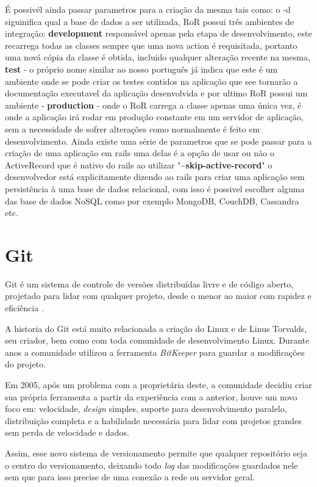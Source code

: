 É possivél ainda passar parametros para a criação da mesma tais como:
o -d siguinifica qual a base de dados a ser utilizada, RoR possui três ambientes de integração: \textbf{development} responsável apenas pela etapa de desenvolvimento, 
este recarrega todas as classes sempre que uma nova action é requisitada, portanto uma nová cópia da classe é obtida, incluido qualquer alteração recente na mesma,
\textbf{test} - o próprio nome similar ao nosso português já indica que este é um ambiente onde se pode criar os testes contidos na aplicação que see tornarão a documentação
executavel da aplicação desenvolvida e por ultimo RoR possui um ambiente - \textbf{production} - onde o RoR carrega a classe apenas uma única vez, é onde a aplicação irá rodar em produção constante em um servidor de aplicação,
sem a necessidade de sofrer alterações como normalmente é feito em desenvolvimento. Ainda existe uma série de parametros que se pode passar para a criação de uma aplicação em rails uma delas é a opção de usar ou não o ActiveRecord
que é nativo do rails ao utilizar "\textbf{--skip-active-record}" o desenvolvedor está explicitamente dizendo ao rails para criar uma aplicação sem persistência à uma base de dados relacional, com isso é possivel escolher alguma das
base de dados NoSQL como por exemplo MongoDB, CouchDB, Cassandra etc.

\section{Git}
Git é um sistema de controle de versões distribuídas livre e de código aberto, projetado para lidar com qualquer projeto, desde o menor ao maior com rapidez e eficiência \cite{SOFTWARE-FREEDOM-CONSERVANCY}.

A historia do Git está muito relacionada a criação do Linux e de Linus Torvalds, seu criador, bem como com toda comunidade de desenvolvimento Linux. Durante anos a comunidade utilizou a ferramenta \textit{BitKeeper} para guardar a modificações do projeto.

Em 2005, após um problema com a proprietária deste, a comunidade decidiu criar sua própria ferramenta a partir da experiência com a anterior, houve um novo foco em: velocidade, \textit{design} simples, suporte para desenvolvimento paralelo, distribuição completa e a habilidade necessária para lidar com projetos grandes sem perda de velocidade e dados.

Assim, esse novo sistema de versionamento permite que qualquer repositório seja o centro do versionamento, deixando todo \textit{log} das modificações guardados nele sem que para isso precise de uma conexão a rede ou servidor geral.